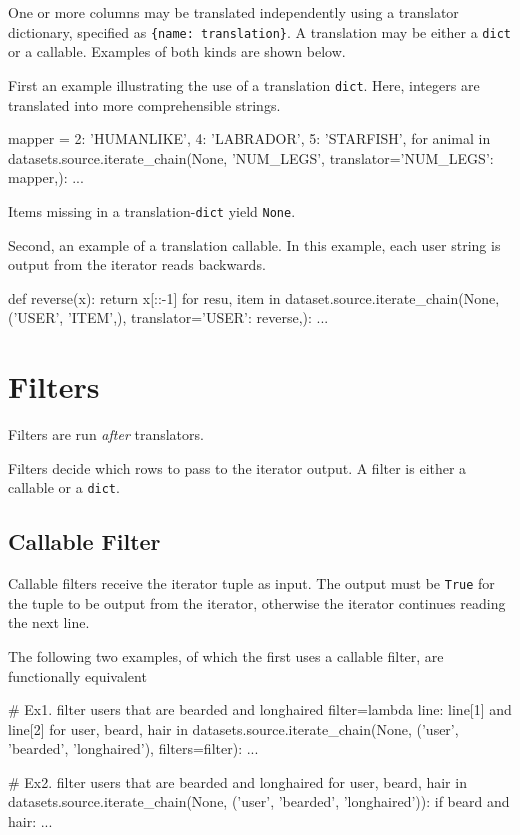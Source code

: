 One or more columns may be translated independently using a translator
dictionary, specified as \texttt{\{name:\ translation\}}.  A
translation may be either a \texttt{dict} or a callable.  Examples of
both kinds are shown below.

First an example illustrating the use of a translation \texttt{dict}.
Here, integers are translated into more comprehensible strings.

\begin{python}
mapper = {2: 'HUMANLIKE', 4: 'LABRADOR', 5: 'STARFISH',}
for animal in datasets.source.iterate_chain(None, 'NUM_LEGS',
                                     translator={'NUM_LEGS': mapper,}):
    ...
\end{python}
Items missing in a translation-\texttt{dict} yield \texttt{None}.

Second, an example of a translation callable.  In this example, each
user string is output from the iterator reads backwards.

\begin{python}
def reverse(x):
    return x[::-1]
for resu, item in dataset.source.iterate_chain(None, ('USER', 'ITEM',),
                                       translator={'USER': reverse,}):
    ...
\end{python}



\section{Filters}

Filters are run \emph{after} translators.

Filters decide which rows to pass to the iterator output.  A filter is
either a callable or a \texttt{dict}.


\subsection*{Callable Filter}

Callable filters receive the iterator tuple as input.  The output must
be \texttt{True} for the tuple to be output from the iterator,
otherwise the iterator continues reading the next line.

The following two examples, of which the first uses a callable filter,
are functionally equivalent

\begin{python}
# Ex1.  filter users that are bearded and longhaired
filter=lambda line: line[1] and line[2]
for user, beard, hair in datasets.source.iterate_chain(None, ('user', 'bearded', 'longhaired'),
                                       filters=filter):
    ...

# Ex2.  filter users that are bearded and longhaired
for user, beard, hair in datasets.source.iterate_chain(None, ('user', 'bearded', 'longhaired')):
    if beard and hair:
        ...
\end{python}




